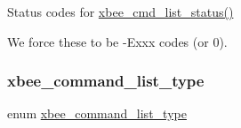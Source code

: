 Status codes for \hyperlink{group__xbee__atcmd_gafb2d1636c675066469ee388170ea27a0}{xbee\+\_\+cmd\+\_\+list\+\_\+status()} 

We force these to be -\/\+Exxx codes (or 0). \mbox{\label{group__xbee__atcmd_ga1bd8ecd38c107579d20ded3c79a7d70b}} 
\subsubsection{\texorpdfstring{xbee\+\_\+command\+\_\+list\+\_\+type}{xbee\_command\_list\_type}}
{\footnotesize\ttfamily enum \hyperlink{group__xbee__atcmd_ga1bd8ecd38c107579d20ded3c79a7d70b}{xbee\+\_\+command\+\_\+list\+\_\+type}}

